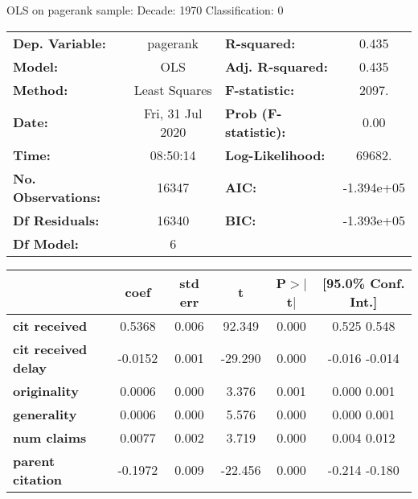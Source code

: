 
OLS on pagerank sample: Decade: 1970 Classification: 0
\begin{center}
\begin{tabular}{lclc}
\toprule
\textbf{Dep. Variable:}     &     pagerank     & \textbf{  R-squared:         } &      0.435    \\
\textbf{Model:}             &       OLS        & \textbf{  Adj. R-squared:    } &      0.435    \\
\textbf{Method:}            &  Least Squares   & \textbf{  F-statistic:       } &      2097.    \\
\textbf{Date:}              & Fri, 31 Jul 2020 & \textbf{  Prob (F-statistic):} &      0.00     \\
\textbf{Time:}              &     08:50:14     & \textbf{  Log-Likelihood:    } &     69682.    \\
\textbf{No. Observations:}  &       16347      & \textbf{  AIC:               } &  -1.394e+05   \\
\textbf{Df Residuals:}      &       16340      & \textbf{  BIC:               } &  -1.393e+05   \\
\textbf{Df Model:}          &           6      & \textbf{                     } &               \\
\bottomrule
\end{tabular}
\begin{tabular}{lccccc}
                            & \textbf{coef} & \textbf{std err} & \textbf{t} & \textbf{P$>$$|$t$|$} & \textbf{[95.0\% Conf. Int.]}  \\
\midrule
\textbf{cit received}       &       0.5368  &        0.006     &    92.349  &         0.000        &         0.525     0.548       \\
\textbf{cit received delay} &      -0.0152  &        0.001     &   -29.290  &         0.000        &        -0.016    -0.014       \\
\textbf{originality}        &       0.0006  &        0.000     &     3.376  &         0.001        &         0.000     0.001       \\
\textbf{generality}         &       0.0006  &        0.000     &     5.576  &         0.000        &         0.000     0.001       \\
\textbf{num claims}         &       0.0077  &        0.002     &     3.719  &         0.000        &         0.004     0.012       \\
\textbf{parent citation}    &      -0.1972  &        0.009     &   -22.456  &         0.000        &        -0.214    -0.180       \\

\end{tabular}
\end{center}
